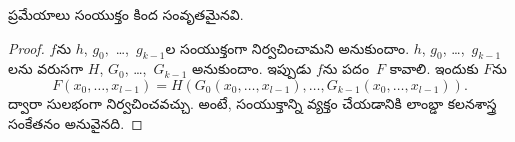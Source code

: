 \documentclass[../../../include/open-logic-section]{subfiles}
\begin{document}

\begin{lem}
 ప్రమేయాలు సంయుక్తం కింద సంవృతమైనవి.
\end{lem}

\begin{proof}
$f$ను $h$, $g_0,$ \dots,~$g_{k-1}$ల సంయుక్తంగా
నిర్వచించామని అనుకుందాం. $h$, $g_0$, \dots,~$g_{k-1}$లను వరుసగా
$H$, $G_0$, \dots,~$G_{k-1}$  అనుకుందాం.
ఇప్పుడు $f$ను  పదం~$F$ కావాలి. ఇందుకు $F$ను
\[
F(x_0, \dots, x_{l-1}) = H(G_0(x_0, \dots, x_{l-1}),
\dots, G_{k-1}(x_0, \dots, x_{l-1})).
\]
ద్వారా సులభంగా నిర్వచించవచ్చు. అంటే, సంయుక్తాన్ని వ్యక్తం చేయడానికి
లాంబ్డా కలనశాస్త్ర సంకేతనం అనువైనది.
%
\end{proof}
\end{document}
